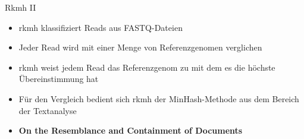 \begin{frame}{Rkmh II}
    \begin{itemize}
        \item rkmh klassifiziert Reads aus FASTQ-Dateien \pause
        \item Jeder Read wird mit einer Menge von Referenzgenomen verglichen \pause
        \item rkmh weist jedem Read das Referenzgenom zu mit dem es die höchste Übereinstimmung hat \pause
        \item Für den Vergleich bedient sich rkmh der MinHash-Methode  aus dem Bereich der Textanalyse \pause
        \item \textbf{On the Resemblance and Containment of Documents \cite{minhash}}
    \end{itemize}
\end{frame}